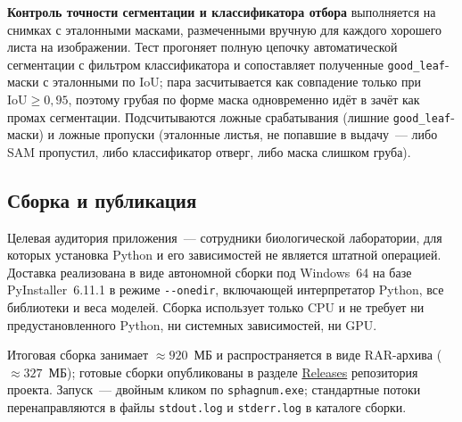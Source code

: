 \textbf{Контроль точности сегментации и классификатора отбора} выполняется
на снимках с эталонными масками, размеченными вручную для каждого хорошего
листа на изображении. Тест прогоняет полную цепочку автоматической
сегментации с фильтром классификатора и сопоставляет полученные
\texttt{good\_leaf}-маски с эталонными по IoU; пара засчитывается как
совпадение только при $\text{IoU} \geq 0{,}95$, поэтому грубая по форме
маска одновременно идёт в зачёт как промах сегментации.
Подсчитываются ложные срабатывания (лишние \texttt{good\_leaf}-маски) и
ложные пропуски (эталонные листья, не попавшие в выдачу~--- либо SAM
пропустил, либо классификатор отверг, либо маска слишком груба).

\subsection{Сборка и публикация}
\label{sec:packaging}

Целевая аудитория приложения~--- сотрудники биологической лаборатории, для которых
установка Python и его зависимостей не является штатной операцией. Доставка
реализована в виде автономной сборки под Windows~64 на базе PyInstaller~6.11.1
в режиме \texttt{-{}-onedir}, включающей интерпретатор Python, все библиотеки и
веса моделей. Сборка использует только CPU и не требует ни предустановленного
Python, ни системных зависимостей, ни GPU.

Итоговая сборка занимает $\approx 920$~МБ и распространяется в виде
RAR-архива ($\approx 327$~МБ); готовые сборки опубликованы в разделе
\href{https://github.com/pavelrubanov/segmentation_system/releases}{Releases}
репозитория проекта. Запуск~--- двойным кликом по \texttt{sphagnum.exe};
стандартные потоки перенаправляются в файлы \texttt{stdout.log} и
\texttt{stderr.log} в каталоге сборки.

